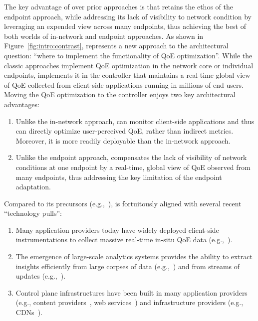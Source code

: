 The key advantage of \ddn over prior approaches is that 
\ddn retains the ethos of the endpoint approach, 
while addressing its lack of visibility to network condition by leveraging 
an expended view across many endpoints, thus achieving 
the best of both worlds of in-network and endpoint approaches.
As shown in Figure~\ref{fig:intro:contrast}, \ddn represents a new approach
to the architectural question: ``where to implement the functionality of QoE 
optimization''.
While the classic approaches implement QoE optimization in the network 
core or individual endpoints, \ddn implements it in the controller 
that maintains a real-time global view of QoE collected from
client-side applications running in millions of end users.
Moving the QoE optimization to the \ddn controller 
enjoys two key architectural advantages:
\begin{enumerate}
\item Unlike the in-network approach, \ddn can monitor client-side applications
and thus can directly optimize user-perceived QoE, rather than indirect metrics.
Moreover, it is more readily deployable than the in-network approach.
\item Unlike the endpoint approach, \ddn compensates the lack of 
visibility of network conditions at one endpoint by a real-time, global view of QoE 
observed from many endpoints, thus addressing the key limitation of 
the endpoint adaptation. 
\end{enumerate}

Compared to its precursors (e.g.,~\cite{spand,seshan1997spand}),
\ddn is fortuitously aligned with several recent  ``technology pulls'':
\begin{enumerate}
\item Many application providers today have widely deployed client-side 
instrumentations to collect massive real-time in-situ QoE data  (e.g.,~\cite{sigcomm11,via,akamai-imc12,artizanetworks}). 
\item The emergence of large-scale analytics systems provides the ability 
to extract insights efficiently from large corpses 
of data (e.g.,~\cite{spark}) and from streams of updates 
(e.g.,~\cite{zaharia2013discretized}). 
\item Control plane infrastructures have been built in many 
application providers (e.g., content providers~\cite{c3}, web services~\cite{footprint})
and infrastructure providers
(e.g., CDNs~\cite{chen2015end,mukerjee2015practical}).
\end{enumerate}


